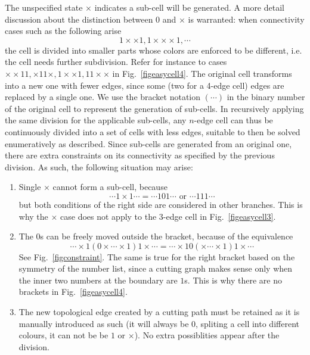 \documentclass[journal]{IEEEtran}
\begin{document}
The unspecified state $\times$ indicates a sub-cell will be generated. %
A more detail discussion about the distinction between $0$ and $\times$ is warranted:
when connectivity cases such as the following arise 
$$1\times\times1, 1\times\times\times1, \cdots$$
the cell is divided into smaller parts whose colors are enforced to be different, i.e. the cell needs further subdivision.
Refer for instance to cases $\times\times11, \times11\times, 1\times\times1, 11\times\times$ in Fig.~\ref{figeasycell4}. 
The original cell transforms into a new one with fewer edges, since some (two for a 4-edge cell) %
edges are replaced by a single one.  
We use the bracket notation $(\cdots)$ in the binary number of the original cell to represent the generation of sub-cells.
In recursively applying the same division for the applicable sub-cells, any $n$-edge cell can thus be continuously divided into 
a set of cells with less edges, suitable to then be solved enumeratively as described. %
Since sub-cells are generated from an original one, there are extra constraints on its connectivity as specified by the previous division. 
As such, the following situation may arise:
\begin{enumerate}
\item Single $\times$ cannot form a sub-cell, because 
$$\cdots 1\times 1\cdots = \cdots 101\cdots \mbox{ or }\cdots 111\cdots$$
but both conditions of the right side are considered in other branches. This is why the $\times$ case does not apply 
to the 3-edge cell in Fig.~\ref{figeasycell3}.  
\item The $0$s can be freely moved outside the bracket, because of the equivalence 
$$\cdots\times1(0\times\cdots\times1)1\times\cdots = \cdots\times10(\times\cdots\times1)1\times\cdots$$ 
See Fig.~\ref{figconstraint}. 
The same is true for the right bracket based on the symmetry of the number list, since a cutting graph makes sense 
only when the inner two numbers at the boundary are $1$s. This is why there are no brackets in Fig.~\ref{figeasycell4}.
\item The new topological edge created by a cutting path must be retained as it is manually introduced as such 
(it will always be $0$, spliting a cell into different colours, it can not be be $1$ or $\times$).  
No extra possiblities appear after the division. 
\end{enumerate}
\end{document}
